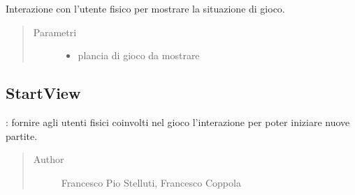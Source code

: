 \documentclass[letterpaper,10pt,italian,openany,oneside]{sphinxmanual}
\begin{document}
\begin{fulllineitems}
\label{\detokenize{source/it/unicam/cs/pa/mastermind/ui/GameView:it.unicam.cs.pa.mastermind.ui.GameView.showGame(BoardModel)}}
Interazione con l’utente fisico per mostrare la situazione di gioco.
\begin{quote}\begin{description}
\item[{Parametri}] \leavevmode\begin{itemize}
\item {} 
 \textendash{} plancia di gioco da mostrare

\end{itemize}

\end{description}\end{quote}

\end{fulllineitems}



\subsection{StartView}
\label{\detokenize{source/it/unicam/cs/pa/mastermind/ui/StartView:startview}}\label{\detokenize{source/it/unicam/cs/pa/mastermind/ui/StartView::doc}}

\begin{fulllineitems}
\label{\detokenize{source/it/unicam/cs/pa/mastermind/ui/StartView:it.unicam.cs.pa.mastermind.ui.StartView}}
: fornire agli utenti fisici coinvolti nel gioco l’interazione per poter iniziare nuove partite.
\begin{quote}\begin{description}
\item[{Author}] \leavevmode
Francesco Pio Stelluti, Francesco Coppola

\end{description}\end{quote}

\end{fulllineitems}
\end{document}
